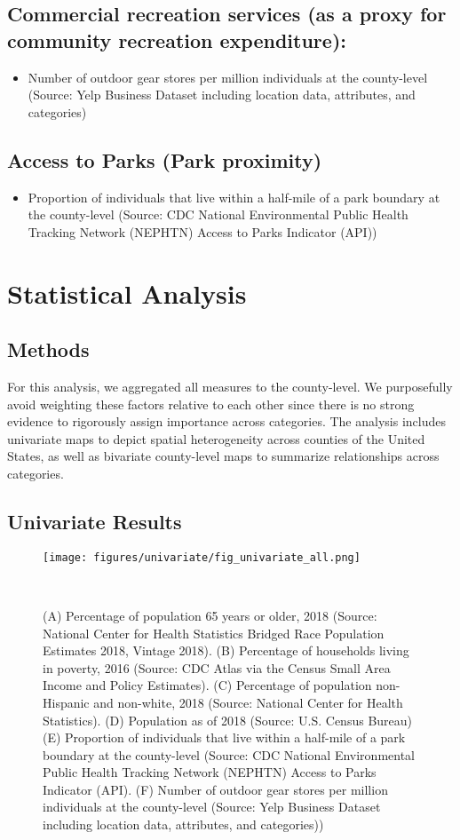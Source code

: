\documentclass{article}
\begin{document}
\subsection{\textbf{Commercial recreation services (as a proxy for community recreation expenditure):}}
\begin{itemize}
\item Number of outdoor gear stores per million individuals at the county-level (Source: Yelp Business Dataset including location data, attributes, and categories)
\end{itemize}


\subsection{\textbf{Access to Parks (Park proximity)}}
\begin{itemize}
\item Proportion of individuals that live within a half-mile of a park boundary at the county-level (Source: CDC National Environmental Public Health Tracking Network (NEPHTN) Access to Parks Indicator (API))
\end{itemize}
\FloatBarrier

\section{\textbf{Statistical Analysis}}
\subsection{\textbf{Methods}}
For this analysis, we aggregated all measures to the county-level. We purposefully avoid weighting these factors relative to each other since there is no strong evidence to rigorously assign importance across categories. The analysis includes univariate maps to depict spatial heterogeneity across counties of the United States, as well as bivariate county-level maps to summarize relationships across categories. 

\subsection{\textbf{Univariate Results}}
\begin{figure}[!h] 
    \centering
    \texttt{[image: figures/univariate/fig\_univariate\_all.png]}
    \caption{(A) Percentage of population 65 years or older, 2018 (Source: National Center for Health Statistics Bridged Race Population Estimates 2018, Vintage 2018). (B) Percentage of households living in poverty, 2016 (Source: CDC Atlas via the Census Small Area Income and Policy Estimates). (C) Percentage of population non-Hispanic and non-white, 2018 (Source: National Center for Health Statistics). (D) Population as of 2018 (Source: U.S. Census Bureau) (E) Proportion of individuals that live within a half-mile of a park boundary at the county-level (Source: CDC National Environmental Public Health Tracking Network (NEPHTN) Access to Parks Indicator (API). (F) Number of outdoor gear stores per million individuals at the county-level (Source: Yelp Business Dataset including location data, attributes, and categories))}
    \
\end{figure}
\FloatBarrier
\end{document}

